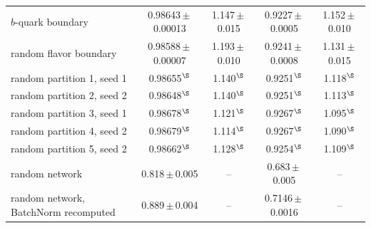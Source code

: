 \documentclass[12pt]{article}   %
\begin{document}
\begin{landscape}
{\begin{center}
\begin{minipage}{\linewidth}
\begin{tabular*}{\linewidth}{@{\extracolsep{\fill}}lcccc@{}}
\quad $b$-quark boundary & 0.98643\,$\pm$\,0.00013 & 1.147\,$\pm$\,0.015 & 0.9227\,$\pm$\,0.0005 & 1.152\,$\pm$\,0.010 \\
\quad random flavor boundary & 0.98588\,$\pm$\,0.00007 & 1.193\,$\pm$\,0.010 & 0.9241\,$\pm$\,0.0008 & 1.131\,$\pm$\,0.015 \\
\quad random partition 1, seed 1 & 0.98655$^{\S}$ & 1.140$^{\S}$ & 0.9251$^{\S}$ & 1.118$^{\S}$ \\
\quad random partition 2, seed 2 & 0.98648$^{\S}$ & 1.140$^{\S}$ & 0.9251$^{\S}$ & 1.113$^{\S}$ \\
\quad random partition 3, seed 1 & 0.98678$^{\S}$ & 1.121$^{\S}$ & 0.9267$^{\S}$ & 1.095$^{\S}$ \\
\quad random partition 4, seed 2 & 0.98679$^{\S}$ & 1.114$^{\S}$ & 0.9267$^{\S}$ & 1.090$^{\S}$ \\
\quad random partition 5, seed 2 & 0.98662$^{\S}$ & 1.128$^{\S}$ & 0.9254$^{\S}$ & 1.109$^{\S}$ \\
random network & 0.818\,$\pm$\,0.005 & -- & 0.683\,$\pm$\,0.005 & -- \\
random network, BatchNorm recomputed & 0.889\,$\pm$\,0.004 & -- & 0.7146\,$\pm$\,0.0016 & -- \\
\bottomrule
\end{tabular*}
\end{minipage}
\end{center}
}
\end{landscape}
\FloatBarrier
\providecommand{\TableContinued}[2]{\label{#2}\ifnum\getpagerefnumber{#2}>\getpagerefnumber{#1}\relax\makebox[\linewidth][l]{\textit{Table~\ref{#1} (continued)}}\par\smallskip\fi}
\end{document}
